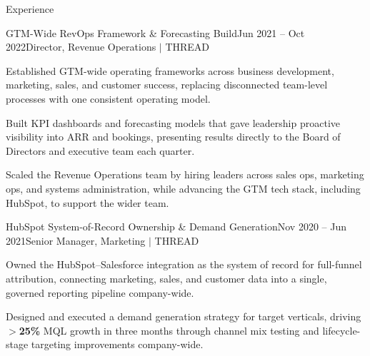 \documentclass{resume}
\begin{document}
\begin{rSection}{Experience}
\begin{rSubsection}{GTM-Wide RevOps Framework \& Forecasting Build}{\textcolor{black!60}{Jun 2021 -- Oct 2022}}{Director, Revenue Operations $\vert$ THREAD}{}
\item Established GTM-wide operating frameworks across business development, marketing, sales, and customer success, replacing disconnected team-level processes with one consistent operating model.
\item Built KPI dashboards and forecasting models that gave leadership proactive visibility into ARR and bookings, presenting results directly to the Board of Directors and executive team each quarter.
\item Scaled the Revenue Operations team by hiring leaders across sales ops, marketing ops, and systems administration, while advancing the GTM tech stack, including HubSpot, to support the wider team.
\end{rSubsection}

\begin{rSubsection}{HubSpot System-of-Record Ownership \& Demand Generation}{\textcolor{black!60}{Nov 2020 -- Jun 2021}}{Senior Manager, Marketing $\vert$ THREAD}{}
\item Owned the HubSpot--Salesforce integration as the system of record for full-funnel attribution, connecting marketing, sales, and customer data into a single, governed reporting pipeline company-wide.
\item Designed and executed a demand generation strategy for target verticals, driving \textbf{$>$25\%} MQL growth in three months through channel mix testing and lifecycle-stage targeting improvements company-wide.
\end{rSubsection}


\end{rSection}
\end{document}
